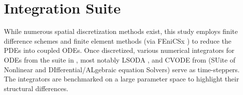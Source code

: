 \section{Integration Suite}
While numerous spatial discretization methods exist, this study employs finite difference schemes and finite element methods (via FEniCSx \cite{baratta2023dolfinx, scroggs2022construction, scroggs2022basix, alnaes2014unified}) to reduce the PDEs into coupled ODEs. Once discretized, various numerical integrators for ODEs from the  suite in  \cite{virtanen_scipy_2020}, most notably LSODA \cite{petzold_automatic_1983}, and CVODE from  (SUite of Nonlinear and DIfferential/ALgebraic equation Solvers) \cite{hindmarsh_sundials_2005, gardner_enabling_2022, hindmarsh_user_2026} serve as time-steppers. The integrators are benchmarked on a large parameter space to highlight their structural differences.

